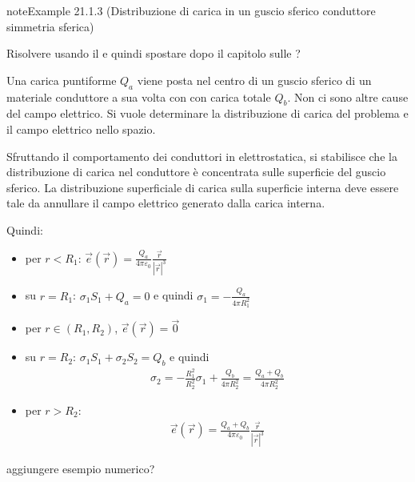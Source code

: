 \documentclass[letterpaper,10pt,italian]{jupyterBook}
\begin{document}
\begin{sphinxadmonition}{note}{Example 21.1.3 (Distribuzione di carica in un guscio sferico conduttore \sphinxhyphen{} simmetria sferica)}



\sphinxAtStartPar
{} Risolvere usando il {\hyperref[\detokenize{ch/electromagnetism/electrostatics:physics-hs-electromagnetism-electrostatics-maxwell-gauss}]{}} e quindi spostare dopo il capitolo sulle {\hyperref[\detokenize{ch/electromagnetism/electrostatics:physics-hs-electromagnetism-electrostatics-maxwell}]{}}?

\sphinxAtStartPar
Una carica puntiforme \(Q_a\) viene posta nel centro di un guscio sferico di un materiale conduttore a sua volta con con carica totale \(Q_b\). Non ci sono altre cause del campo elettrico. Si vuole determinare la distribuzione di carica del problema e il campo elettrico nello spazio.

\sphinxAtStartPar
Sfruttando il comportamento dei conduttori in elettrostatica, si stabilisce che la distribuzione di carica nel conduttore è concentrata sulle superficie del guscio sferico. La distribuzione superficiale di carica sulla superficie interna deve essere tale da annullare il campo elettrico generato dalla carica interna.

\sphinxAtStartPar
Quindi:
\begin{itemize}
\item {} 
\sphinxAtStartPar
per \(r < R_1\): \(\vec{e}(\vec{r}) = \frac{Q_a}{4 \pi \varepsilon_0}\frac{\vec{r}}{|\vec{r}|^3} \)

\item {} 
\sphinxAtStartPar
su \(r = R_1\): \(\sigma_1 S_1 + Q_a = 0\) e quindi \(\sigma_1 = -\frac{Q_a}{4 \pi R_1^2}\)

\item {} 
\sphinxAtStartPar
per \(r \in (R_1, R_2)\), \(\vec{e}(\vec{r}) = \vec{0}\)

\item {} 
\sphinxAtStartPar
su \(r = R_2\): \(\sigma_1 S_1 + \sigma_2 S_2 = Q_b\) e quindi
\begin{equation*}
\begin{split}\sigma_2 = - \frac{R_1^2}{R_2^2} \sigma_1 + \frac{Q_b}{4 \pi R_2^2} = \frac{Q_a + Q_b}{4 \pi R_2^2}\end{split}
\end{equation*}
\item {} 
\sphinxAtStartPar
per \(r > R_2\):
\begin{equation*}
\begin{split}\vec{e}(\vec{r}) = \frac{Q_a + Q_b}{4 \pi \varepsilon_0} \frac{\vec{r}}{|\vec{r}|^3}\end{split}
\end{equation*}
\end{itemize}

\sphinxAtStartPar
{} aggiungere esempio numerico?
\end{sphinxadmonition}
\end{document}
